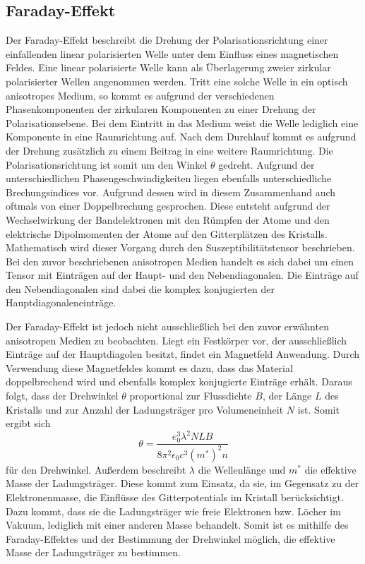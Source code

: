 \subsection{Faraday-Effekt}
Der Faraday-Effekt beschreibt die Drehung der Polarisationsrichtung einer einfallenden linear
polarisierten Welle unter dem Einfluss eines magnetischen Feldes. Eine linear polarisierte Welle
kann als Überlagerung zweier zirkular polarisierter Wellen angenommen werden. Tritt eine solche Welle in
ein optisch anisotropes Medium, so kommt es aufgrund der verschiedenen Phasenkomponenten der zirkularen
Komponenten zu einer Drehung der Polarisationsebene. Bei dem Eintritt in das Medium weist die Welle
lediglich eine Komponente in eine Raumrichtung auf. Nach dem Durchlauf kommt es aufgrund der Drehung
zusätzlich zu einem Beitrag in eine weitere Raumrichtung. Die Polarisationsrichtung ist somit um den
Winkel $\theta$ gedreht. Aufgrund der unterschiedlichen Phasengeschwindigkeiten liegen ebenfalls
unterschiedliche Brechungsindices vor. Aufgrund dessen wird in diesem Zusammenhand auch oftmals von einer
Doppelbrechung gesprochen. Diese entsteht aufgrund der
Wechselwirkung der Bandelektronen mit den Rümpfen der Atome und
den elektrische Dipolmomenten der Atome auf den Gitterplätzen des Kristalls. \\
Mathematisch wird dieser Vorgang durch den Suszeptibilitätstensor beschrieben. Bei den zuvor beschriebenen
anisotropen Medien handelt es sich dabei um einen Tensor mit Einträgen auf der Haupt- und den Nebendiagonalen.
Die Einträge auf den Nebendiagonalen sind dabei die komplex konjugierten der Hauptdiagonaleneinträge. \\
\par
Der Faraday-Effekt ist jedoch nicht ausschließlich bei den zuvor erwähnten anisotropen Medien zu beobachten.
Liegt ein Festkörper vor, der ausschließlich Einträge auf der Hauptdiagolen besitzt, findet ein
Magnetfeld Anwendung. Durch Verwendung diese Magnetfeldes kommt es dazu, dass das Material doppelbrechend wird
und ebenfalls komplex konjugierte Einträge erhält. Daraus folgt, dass der Drehwinkel $\theta$
proportional zur Flussdichte $B$, der Länge $L$ des Kristalls und zur Anzahl der Ladungsträger pro Volumeneinheit $N$
ist. Somit ergibt sich
\begin{equation}
    \theta = \frac{e_0^3 \lambda ^2 N L B}{8 \pi^2 \epsilon_0 c^3 (m^*)^2 n}
    \label{eqn:effmass}
\end{equation} \noindent
für den Drehwinkel. Außerdem beschreibt $\lambda$ die Wellenlänge und $m^*$ die effektive Masse der
Ladungsträger. Diese kommt zum Einsatz, da sie, im Gegensatz zu der Elektronenmasse, die Einflüsse des
Gitterpotentials im Kristall berücksichtigt. Dazu kommt, dass sie die Ladungsträger wie freie Elektronen bzw.
Löcher im Vakuum, lediglich mit einer anderen Masse behandelt. Somit ist es mithilfe des Faraday-Effektes und der Bestimmung
der Drehwinkel möglich, die effektive Masse der Ladungsträger zu bestimmen.
